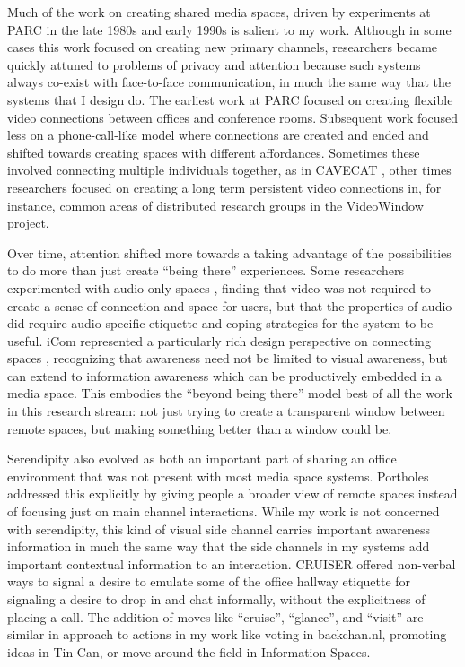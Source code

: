 \documentclass{tufte-handout}
\begin{document}
Much of the work on creating shared media spaces, driven by experiments at PARC in the late 1980s and early 1990s is salient to my work. Although in some cases this work focused on creating new primary channels, researchers became quickly attuned to problems of privacy and attention because such systems always co-exist with face-to-face communication, in much the same way that the systems that I design do. The earliest work at PARC \citet{olsen_bly_portland} focused on creating flexible video connections between offices and conference rooms. Subsequent work focused less on a phone-call-like model where connections are created and ended and shifted towards creating spaces with different affordances. Sometimes these involved connecting multiple individuals together, as in CAVECAT \citet{cavecat}, other times researchers focused on creating a long term persistent video connections in, for instance, common areas of distributed research groups in the VideoWindow project\citet{videowindow}. 

Over time, attention shifted more towards a taking advantage of the possibilities to do more than just create ``being there'' experiences. Some researchers experimented with audio-only spaces \citet{thunderwire}, finding that video was not required to create a sense of connection and space for users, but that the properties of audio did require audio-specific etiquette and coping strategies for the system to be useful. iCom represented a particularly rich design perspective on connecting spaces  \citet{stefan_icom}, recognizing that awareness need not be limited to visual awareness, but can extend to information awareness which can be productively embedded in a media space. This embodies the ``beyond being there'' model best of all the work in this research stream: not just trying to create a transparent window between remote spaces, but making something better than a window could be.




Serendipity also evolved as both an important part of sharing an office environment that was not present with most media space systems. Portholes \citet{portholes} addressed this explicitly by giving people a broader view of remote spaces instead of focusing just on main channel interactions. While my work is not concerned with serendipity, this kind of visual side channel carries important awareness information in much the same way that the side channels in my systems add important contextual information to an interaction. CRUISER \citet{fish_kraut_cruiser} offered non-verbal ways to signal a desire to emulate some of the office hallway etiquette for signaling a desire to drop in and chat informally, without the explicitness of placing a call. The addition of moves like ``cruise'', ``glance'', and ``visit'' are similar in approach to actions in my work like voting in backchan.nl, promoting ideas in Tin Can, or move around the field in Information Spaces. 
\end{document}
